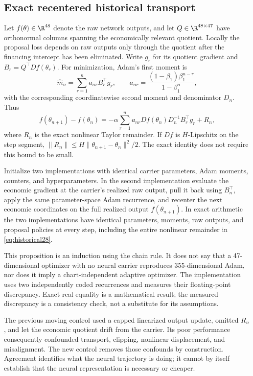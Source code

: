 \subsection{Exact recentered historical transport}\label{sec:transport28}
Let $f(\theta)\in\R^{48}$ denote the raw network outputs, and let $Q\in\R^{48\times47}$ have orthonormal columns spanning the economically relevant quotient. Locally the proposal loss depends on raw outputs only through the quotient after the financing intercept has been eliminated. Write $g_r$ for its quotient gradient and $B_r=Q^\top Df(\theta_r)$. For minimization, Adam's first moment is
\begin{equation}
 \widehat m_n=\sum_{r=1}^n a_{nr}B_r^\top g_r,
 \qquad a_{nr}=\frac{(1-\beta_1)\beta_1^{n-r}}{1-\beta_1^n},
\end{equation}
with the corresponding coordinatewise second moment and denominator $D_n$. Thus
\begin{equation}\label{eq:historical28}
 f(\theta_{n+1})-f(\theta_n)
 =-\alpha\sum_{r=1}^n a_{nr}Df(\theta_n)D_n^{-1}B_r^\top g_r+R_n,
\end{equation}
where $R_n$ is the exact nonlinear Taylor remainder. If $Df$ is $H$-Lipschitz on the step segment, $\|R_n\|\le H\|\theta_{n+1}-\theta_n\|^2/2$. The exact identity does not require this bound to be small.
\begin{proposition}\label{prop:transport28}
Initialize two implementations with identical carrier parameters, Adam moments, counters, and hyperparameters. In the second implementation evaluate the economic gradient at the carrier's realized raw output, pull it back using $B_n^\top$, apply the same parameter-space Adam recurrence, and recenter the next economic coordinates on the full realized output $f(\theta_{n+1})$. In exact arithmetic the two implementations have identical parameters, moments, raw outputs, and proposal policies at every step, including the entire nonlinear remainder in \eqref{eq:historical28}.
\end{proposition}
This proposition is an induction using the chain rule. It does not say that a 47-dimensional optimizer with no neural carrier reproduces 355-dimensional Adam, nor does it imply a chart-independent adaptive optimizer. The implementation uses two independently coded recurrences and measures their floating-point discrepancy. Exact real equality is a mathematical result; the measured discrepancy is a consistency check, not a substitute for its assumptions.

The previous moving control used a capped linearized output update, omitted $R_n$, and let the economic quotient drift from the carrier. Its poor performance consequently confounded transport, clipping, nonlinear displacement, and misalignment. The new control removes those confounds by construction. Agreement identifies what the neural trajectory is doing; it cannot by itself establish that the neural representation is necessary or cheaper.
